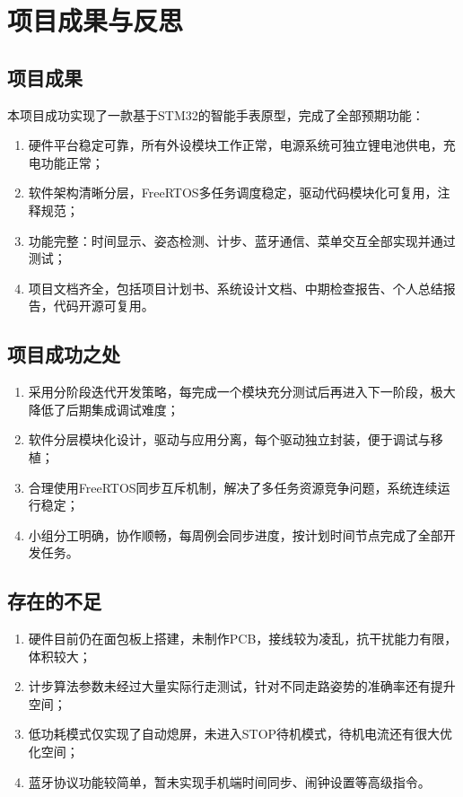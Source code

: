 \documentclass[12pt, a4paper]{ctexart}
\begin{document}
\section{项目成果与反思}
\subsection{项目成果}
本项目成功实现了一款基于STM32的智能手表原型，完成了全部预期功能：
\begin{enumerate}
    \item 硬件平台稳定可靠，所有外设模块工作正常，电源系统可独立锂电池供电，充电功能正常；
    \item 软件架构清晰分层，FreeRTOS多任务调度稳定，驱动代码模块化可复用，注释规范；
    \item 功能完整：时间显示、姿态检测、计步、蓝牙通信、菜单交互全部实现并通过测试；
    \item 项目文档齐全，包括项目计划书、系统设计文档、中期检查报告、个人总结报告，代码开源可复用。
\end{enumerate}

\subsection{项目成功之处}
\begin{enumerate}
    \item 采用分阶段迭代开发策略，每完成一个模块充分测试后再进入下一阶段，极大降低了后期集成调试难度；
    \item 软件分层模块化设计，驱动与应用分离，每个驱动独立封装，便于调试与移植；
    \item 合理使用FreeRTOS同步互斥机制，解决了多任务资源竞争问题，系统连续运行稳定；
    \item 小组分工明确，协作顺畅，每周例会同步进度，按计划时间节点完成了全部开发任务。
\end{enumerate}

\subsection{存在的不足}
\begin{enumerate}
    \item 硬件目前仍在面包板上搭建，未制作PCB，接线较为凌乱，抗干扰能力有限，体积较大；
    \item 计步算法参数未经过大量实际行走测试，针对不同走路姿势的准确率还有提升空间；
    \item 低功耗模式仅实现了自动熄屏，未进入STOP待机模式，待机电流还有很大优化空间；
    \item 蓝牙协议功能较简单，暂未实现手机端时间同步、闹钟设置等高级指令。
\end{enumerate}
\end{document}
